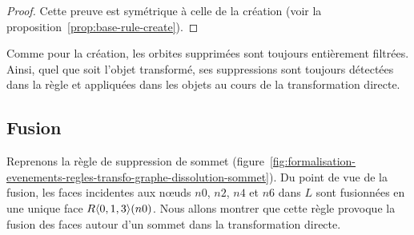 \begin{proof}
	Cette preuve est symétrique à celle de la création (voir la proposition~\ref{prop:base-rule-create}).
\end{proof}





Comme pour la création, les orbites supprimées sont toujours entièrement
filtrées. %
Ainsi, quel que soit l'objet transformé, ses suppressions sont toujours
détectées dans la règle et appliquées dans les objets au cours de la
transformation directe. %


\subsection{Fusion}
\label{sec:formalisation-evenements-regles-transfo-graphe-fusion}


Reprenons la règle de suppression de sommet (figure~\ref{fig:formalisation-evenements-regles-transfo-graphe-dissolution-sommet}). %
Du point de vue de la fusion, les faces incidentes aux n\oe uds $n0$, $n2$, $n4$ et $n6$
dans $L$ sont fusionnées en une unique face $R\langle0,1,3\rangle(n0)$. %
Nous allons montrer que cette règle provoque la fusion des faces autour d'un sommet dans la transformation directe. %

